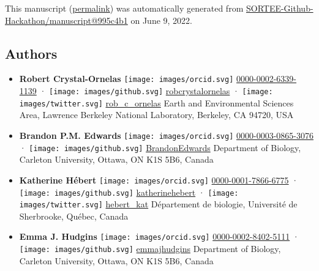 This manuscript
(\href{https://SORTEE-Github-Hackathon.github.io/manuscript/v/995c4b12819cee4b095a8c81c7f5303afab9534e/}{permalink})
was automatically generated
from \href{https://github.com/SORTEE-Github-Hackathon/manuscript/tree/995c4b12819cee4b095a8c81c7f5303afab9534e}{SORTEE-Github-Hackathon/manuscript@995c4b1}
on June 9, 2022.

\hypertarget{authors}{%
\subsection{Authors}\label{authors}}

\begin{itemize}
\item
  \textbf{Robert Crystal-Ornelas}
  \texttt{[image: images/orcid.svg]}
  \href{https://orcid.org/0000-0002-6339-1139}{0000-0002-6339-1139}
  · \texttt{[image: images/github.svg]}
  \href{https://github.com/robcrystalornelas}{robcrystalornelas}
  · \texttt{[image: images/twitter.svg]}
  \href{https://twitter.com/rob_c_ornelas}{rob\_c\_ornelas}
  Earth and Environmental Sciences Area, Lawrence Berkeley National Laboratory, Berkeley, CA 94720, USA
\item
  \textbf{Brandon P.M. Edwards}
  \texttt{[image: images/orcid.svg]}
  \href{https://orcid.org/0000-0003-0865-3076}{0000-0003-0865-3076}
  · \texttt{[image: images/github.svg]}
  \href{https://github.com/BrandonEdwards}{BrandonEdwards}
  Department of Biology, Carleton University, Ottawa, ON K1S 5B6, Canada
\item
  \textbf{Katherine Hébert}
  \texttt{[image: images/orcid.svg]}
  \href{https://orcid.org/0000-0001-7866-6775}{0000-0001-7866-6775}
  · \texttt{[image: images/github.svg]}
  \href{https://github.com/katherinehebert}{katherinehebert}
  · \texttt{[image: images/twitter.svg]}
  \href{https://twitter.com/hebert_kat}{hebert\_kat}
  Département de biologie, Université de Sherbrooke, Québec, Canada
\item
  \textbf{Emma J. Hudgins}
  \texttt{[image: images/orcid.svg]}
  \href{https://orcid.org/0000-0002-8402-5111}{0000-0002-8402-5111}
  · \texttt{[image: images/github.svg]}
  \href{https://github.com/emmajhudgins}{emmajhudgins}
  Department of Biology, Carleton University, Ottawa, ON K1S 5B6, Canada

\end{itemize}
